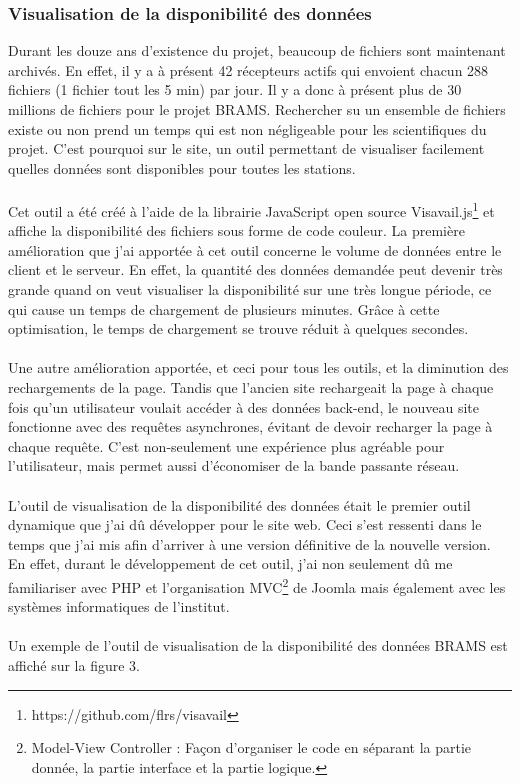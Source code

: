 \documentclass[11pt]{article}
\begin{document}
\subsubsection{Visualisation de la disponibilité des données}

Durant les douze ans d'existence du projet, beaucoup de fichiers sont maintenant archivés.
En effet, il y a à présent 42 récepteurs actifs qui envoient chacun 288 fichiers (1 fichier tout les 5 min) par jour.
Il y a donc à présent plus de 30 millions de fichiers pour le projet BRAMS.
Rechercher su un ensemble de fichiers existe ou non prend un temps qui est non négligeable pour les scientifiques du projet.
C'est pourquoi sur le site, un outil permettant de visualiser facilement quelles données sont disponibles pour toutes les stations.\\
\\
Cet outil a été créé à l'aide de la librairie JavaScript open source Visavail.js\footnote{https://github.com/flrs/visavail} et affiche la disponibilité des fichiers sous forme de code couleur.
La première amélioration que j'ai apportée à cet outil concerne le volume de données entre le client et le serveur.
En effet, la quantité des données demandée peut devenir très grande quand on veut visualiser la disponibilité sur une très longue période, ce qui cause un temps de chargement de plusieurs minutes.
Grâce à cette optimisation, le temps de chargement se trouve réduit à quelques secondes.\\
\\
Une autre amélioration apportée, et ceci pour tous les outils, et la diminution des rechargements de la page.
Tandis que l'ancien site rechargeait la page à chaque fois qu'un utilisateur voulait accéder à des données back-end, le nouveau site fonctionne avec des requêtes asynchrones, évitant de devoir recharger la page à chaque requête.
C'est non-seulement une expérience plus agréable pour l'utilisateur, mais permet aussi d'économiser de la bande passante réseau.\\
\\
L'outil de visualisation de la disponibilité des données était le premier outil dynamique que j'ai dû développer pour le site web.
Ceci s'est ressenti dans le temps que j'ai mis afin d'arriver à une version définitive de la nouvelle version.
En effet, durant le développement de cet outil, j'ai non seulement dû me familiariser avec PHP et l'organisation MVC\footnote{Model-View Controller : Façon d'organiser le code en séparant la partie donnée, la partie interface et la partie logique.} de Joomla mais également avec les systèmes informatiques de l'institut.\\
\\
Un exemple de l'outil de visualisation de la disponibilité des données BRAMS est affiché sur la figure 3.
\end{document}
